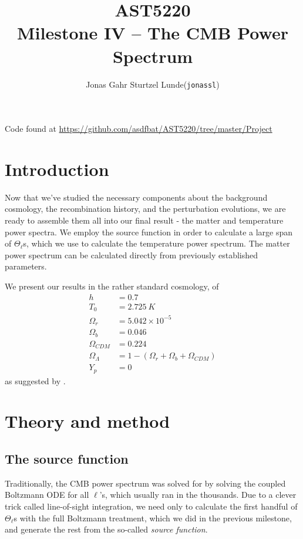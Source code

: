 \documentclass[10pt, a4paper]{article}
\begin{document}
\title{AST5220\\ Milestone IV -- The CMB Power Spectrum}
\author{
    \begin{tabular}{r l}
        Jonas Gahr Sturtzel Lunde & (\texttt{jonassl})
    \end{tabular}}

\maketitle
Code found at \url{https://github.com/asdfbat/AST5220/tree/master/Project}
\vspace{0.7cm}

\section{Introduction}
Now that we've studied the necessary components about the background cosmology, the recombination history, and the perturbation evolutions, we are ready to assemble them all into our final result - the matter and temperature power spectra. We employ the source function in order to calculate a large span of $\Theta_\ell$s, which we use to calculate the temperature power spectrum. The matter power spectrum can be calculated directly from previously established parameters.

We present our results in the rather standard cosmology, of
\begin{align*}
    h &= 0.7 \\
    T_0 &= \SI{2.725}{K} \\
    \Omega_r &= 5.042\times 10^{-5} \\
    \Omega_b &= 0.046 \\
    \Omega_{CDM} &= 0.224 \\
    \Omega_\Lambda &= 1 - (\Omega_r + \Omega_b + \Omega_{CDM}) \\
    Y_p &= 0
\end{align*}
as suggested by \cite{callin2006}.

\section{Theory and method}
\subsection{The source function}
Traditionally, the CMB power spectrum was solved for by solving the coupled Boltzmann ODE for all $\ell$'s, which usually ran in the thousands. Due to a clever trick called line-of-sight integration, we need only to calculate the first handful of $\Theta_\ell$s with the full Boltzmann treatment, which we did in the previous milestone, and generate the rest from the so-called \textit{source function}.
\end{document}
